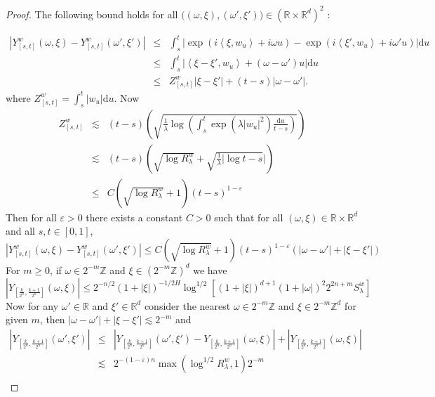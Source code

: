 \documentclass[11pt,a4paper,draft,reqno]{amsart}
\theoremstyle{definition}
\newcommand{\RR}{\mathbb{R}}
\newcommand{\ZZ}{\mathbb{Z}}
\newcommand{\dd}{\mathrm{d}}
\newcommand{\eps}{\varepsilon}
\newcommand{\la}{\left\langle}
\newcommand{\ra}{\right\rangle}
\begin{document}
\begin{proof}
The following bound holds for all $\big((\omega,\xi),(\omega',\xi')\big)\in \left(\RR\times\RR^d\right)^2$ : 

\begin{eqnarray}\label{majoration lipschitz}
\left|Y^w_{[s,t]}(\omega,\xi)-Y^w_{[s,t]}(\omega',\xi')\right|
&\le&
\int_{s}^t\left|\exp\left(i\la\xi,w_u\ra+i \omega u \right) - \exp\left(i\la\xi',w_u\ra+i \omega' u \right)\right|\dd u\nonumber\\
&\le&
\int_{s}^t\left|\la\xi-\xi',w_u\ra + (\omega-\omega')u\right|\dd u\nonumber\\
&\le&
Z^w_{[s,t]}|\xi-\xi'|+(t-s)|\omega-\omega'|.
\end{eqnarray}
where
$Z^w_{[s,t]}=\int_s^t|w_u|\dd u$.
Now
\begin{eqnarray*}
Z^w_{[s,t]}
&\lesssim&
(t-s)\left(\sqrt{{\frac1\lambda}\log\left(\int_s^t \exp(\lambda|w_u|^2) \frac{\dd u}{t-s}\right)}\right)\\
&\lesssim&
 (t-s)\left(\sqrt{\log R^w_\lambda}+\sqrt{{\frac1\lambda}|\log t-s}|\right)\\
&\le&
C\left(\sqrt{\log R^w_\lambda}+1\right)(t-s)^{1-\eps}
\end{eqnarray*}
Then for all $\eps>0$ there exists a constant $C>0$ such that for all $(\omega,\xi)\in\RR\times\RR^d$ and all $s,t\in[0,1]$,
\begin{equation}\label{majoration Y quasi lipschitz}
|Y^w_{[s,t]}(\omega,\xi)-Y^w_{[s,t]}(\omega',\xi')|\le C(\sqrt{\log R^w_\lambda}+1)(t-s)^{1-\eps}(|\omega-\omega'|+|\xi-\xi'|)
\end{equation}
For $m\ge0$, if $\omega\in 2^{-m}\ZZ$ and $\xi \in (2^{-m}\ZZ)^d$ we have
\begin{equation*}
|Y_{[\frac k {2^{n}},\frac {k+1} {2^{n}}]}(\omega,\xi)| 
\le 
2^{-n/2} (1+|\xi|)^{-1/2H} \log^{1/2}\left[(1+|\xi|)^{d+1} (1+|\omega|)^2 2^{2n+m} S^w_\lambda\right]
\end{equation*}
Now for any $\omega'\in\RR$ and $\xi'\in\RR^d$ consider the nearest $\omega\in 2^{-m}\ZZ$ and $\xi \in 2^{-m}\ZZ^d$ for given $m$, then
$|\omega-\omega'|+|\xi-\xi'|\lesssim 2^{-m}$
and
\begin{eqnarray*}
|Y_{[\frac k {2^{n}},\frac {k+1} {2^{n}}]}(\omega',\xi')| 
&\le&
|Y_{[\frac k {2^{n}},\frac {k+1} {2^{n}}]}(\omega',\xi')-Y_{[\frac k {2^{n}},\frac {k+1} {2^{n}}]}(\omega,\xi)|+|Y_{[\frac k {2^{n}},\frac {k+1} {2^{n}}]}(\omega,\xi)|\\
&\lesssim&   
2^{-(1-\eps)n} \max(\log^{1/2}R^w_\lambda,1) 2^{-m}\\

\end{eqnarray*}
\end{proof}
\end{document}
